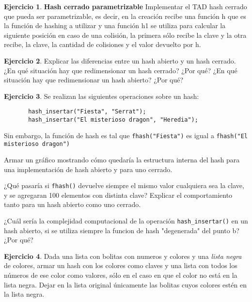 \documentclass[11pt,a4paper]{article}
\theoremstyle{definition}
\newtheorem{ejercicio}{Ejercicio}[section]
\begin{document}
\begin{ejercicio}
\textbf{Hash cerrado parametrizable} Implementar el TAD hash cerrado que
pueda ser parametrizable, es decir, en la creación recibe una función h que es la
función de hashing a utilizar y una función h1 se utiliza para calcular la
siguiente posición en caso de una colisión, la primera sólo recibe la clave
y la otra recibe, la clave, la cantidad de colisiones y el valor devuelto
por h.
\end{ejercicio}

\begin{ejercicio}
Explicar las diferencias entre un hash abierto y un hash cerrado. ¿En qué
situación hay que redimensionar un hash cerrado? ¿Por qué? ¿En qué
situación hay que redimensionar un hash abierto? ¿Por qué?
\end{ejercicio}

\begin{ejercicio}
Se realizan las siguientes operaciones sobre un hash:
\begin{lstlisting}
       hash_insertar("Fiesta", "Serrat");
       hash_insertar("El misterioso dragon", "Heredia");
\end{lstlisting}
Sin embargo, la función de hash es tal que
\lstinline!fhash("Fiesta")! es igual a \lstinline!fhash("El misterioso dragon")!
\begin{partes}
\item Armar un gráfico mostrando cómo quedaría la estructura interna del hash
para una implementación de hash abierto y para uno cerrado.
\item ¿Qué pasaría si \lstinline!fhash()! devuelve siempre el mismo valor
cualquiera sea la clave, y se agregaran 100 elementos con distinta clave?
Explicar el comportamiento tanto para un hash abierto como uno cerrado.
\item ¿Cuál sería la complejidad computacional de la operación
\lstinline!hash_insertar()! en un hash abierto, si se utiliza siempre la
funcion de hash "degenerada" del punto b? ¿Por qué?
\end{partes}
\end{ejercicio}

\begin{ejercicio}
Dada una lista con bolitas con numeros y colores y una \textit{lista negra}
de colores, armar un hash con los colores como claves y una lista con todos
los números de ese color como valores, sólo en el caso en que el color no
está en la lista negra. Dejar en la lista original únicamente las bolitas
cuyos colores estén en la lista negra.
\end{ejercicio}
\end{document}
